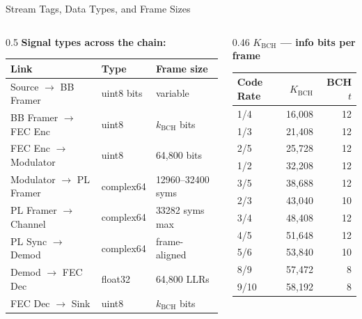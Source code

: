 \documentclass[aspectratio=169,10pt]{beamer}
\begin{document}
\begin{frame}{Stream Tags, Data Types, and Frame Sizes}
\begin{columns}[T]
\begin{column}{0.5\textwidth}
      \vspace{0.4em}
      \textbf{Signal types across the chain:}
      {\scriptsize
      \begin{tabular}{lll}
        \toprule
        \textbf{Link} & \textbf{Type} & \textbf{Frame size}\\
        \midrule
        Source $\to$ BB Framer   & uint8 bits  & variable\\
        BB Framer $\to$ FEC Enc  & uint8       & $k_\text{BCH}$ bits\\
        FEC Enc $\to$ Modulator  & uint8       & 64,800 bits\\
        Modulator $\to$ PL Framer& complex64   & 12960--32400 syms\\
        PL Framer $\to$ Channel  & complex64   & 33282 syms max\\
        PL Sync $\to$ Demod      & complex64   & frame-aligned\\
        Demod $\to$ FEC Dec      & float32     & 64,800 LLRs\\
        FEC Dec $\to$ Sink       & uint8       & $k_\text{BCH}$ bits\\
        \bottomrule
      \end{tabular}}
    \end{column}
    \begin{column}{0.46\textwidth}
      \textbf{$K_\text{BCH}$ — info bits per frame}
      {\scriptsize
      \begin{tabular}{lrr}
        \toprule
        \textbf{Code Rate} & \textbf{$K_\text{BCH}$} & \textbf{BCH $t$}\\
        \midrule
        1/4   & 16,008 & 12\\
        1/3   & 21,408 & 12\\
        2/5   & 25,728 & 12\\
        1/2   & 32,208 & 12\\
        3/5   & 38,688 & 12\\
        2/3   & 43,040 & 10\\
        3/4   & 48,408 & 12\\
        4/5   & 51,648 & 12\\
        5/6   & 53,840 & 10\\
        8/9   & 57,472 &  8\\
        9/10  & 58,192 &  8\\
        \bottomrule
      \end{tabular}}


\end{column}
\end{columns}
\end{frame}
\end{document}
